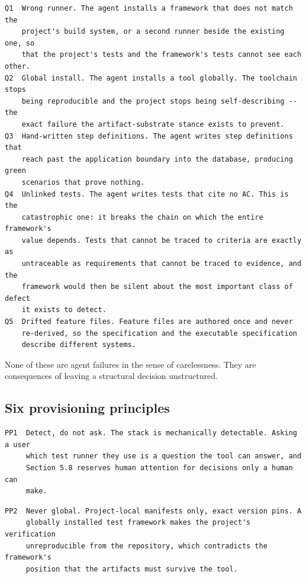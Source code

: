 \documentclass[11pt,a4paper]{article}
\begin{document}
\begin{Verbatim}[fontsize=\footnotesize,breaklines=true,breakanywhere=true,breakautoindent=false,samepage=false]
Q1  Wrong runner. The agent installs a framework that does not match the
    project's build system, or a second runner beside the existing one, so
    that the project's tests and the framework's tests cannot see each other.
Q2  Global install. The agent installs a tool globally. The toolchain stops
    being reproducible and the project stops being self-describing -- the
    exact failure the artifact-substrate stance exists to prevent.
Q3  Hand-written step definitions. The agent writes step definitions that
    reach past the application boundary into the database, producing green
    scenarios that prove nothing.
Q4  Unlinked tests. The agent writes tests that cite no AC. This is the
    catastrophic one: it breaks the chain on which the entire framework's
    value depends. Tests that cannot be traced to criteria are exactly as
    untraceable as requirements that cannot be traced to evidence, and the
    framework would then be silent about the most important class of defect
    it exists to detect.
Q5  Drifted feature files. Feature files are authored once and never
    re-derived, so the specification and the executable specification
    describe different systems.
\end{Verbatim}

None of these are agent failures in the sense of carelessness. They are consequences of leaving a structural decision unstructured.

\subsection{Six provisioning principles}

\begin{Verbatim}[fontsize=\footnotesize,breaklines=true,breakanywhere=true,breakautoindent=false,samepage=false]
PP1  Detect, do not ask. The stack is mechanically detectable. Asking a user
     which test runner they use is a question the tool can answer, and
     Section 5.8 reserves human attention for decisions only a human can
     make.
\end{Verbatim}

\begin{Verbatim}[fontsize=\footnotesize,breaklines=true,breakanywhere=true,breakautoindent=false,samepage=false]
PP2  Never global. Project-local manifests only, exact version pins. A
     globally installed test framework makes the project's verification
     unreproducible from the repository, which contradicts the framework's
     position that the artifacts must survive the tool.
\end{Verbatim}
\end{document}
